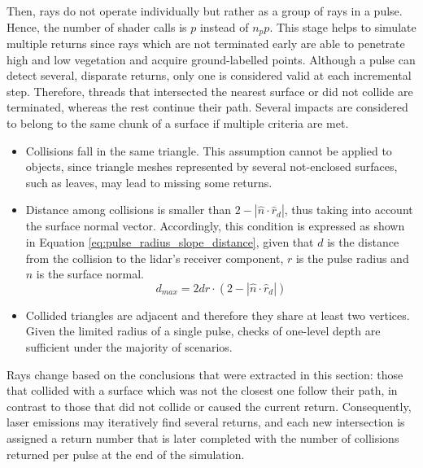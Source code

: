 Then, rays do not operate individually but rather as a group of rays in a pulse. Hence, the number of shader calls is $p$ instead of $n_{p}p$. This stage helps to simulate multiple returns since rays which are not terminated early are able to penetrate high and low vegetation and acquire ground-labelled points. Although a pulse can detect several, disparate returns, only one is considered valid at each incremental step. Therefore, threads that intersected the nearest surface or did not collide are terminated, whereas the rest continue their path. Several impacts are considered to belong to the same chunk of a surface if multiple criteria are met. 
\begin{itemize}
    \item Collisions fall in the same triangle. This assumption cannot be applied to objects, since triangle meshes represented by several not-enclosed surfaces, such as leaves, may lead to missing some returns.
    \item Distance among collisions is smaller than $2 - \left|\hat{n} \cdot \hat{r}_{d}\right|$, thus taking into account the surface normal vector. Accordingly, this condition is expressed as shown in Equation \ref{eq:pulse_radius_slope_distance}, given that $d$ is the distance from the collision to the \acrshort{lidar}'s receiver component, $r$ is the pulse radius and $\hat{n}$ is the surface normal.
    \begin{equation}
        \label{eq:pulse_radius_slope_distance}
        d_{\textit{max}} = 2dr \cdot (2 - \left|\hat{n} \cdot \hat{r}_{d}\right|)
    \end{equation}
    \item Collided triangles are adjacent and therefore they share at least two vertices. Given the limited radius of a single pulse, checks of one-level depth are sufficient under the majority of scenarios.
\end{itemize}

Rays change based on the conclusions that were extracted in this section: those that collided with a surface which was not the closest one follow their path, in contrast to those that did not collide or caused the current return. Consequently, laser emissions may iteratively find several returns, and each new intersection is assigned a return number that is later completed with the number of collisions returned per pulse at the end of the simulation. 
  
